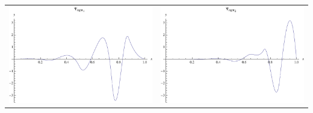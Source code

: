 \documentclass{article}
\begin{document}
\begin{landscape}
\begin{tabular}{cc}
\includegraphics[width=10.cm]{cubic_wavelet_dright_1.pdf}& \includegraphics[width=10.cm]{cubic_wavelet_dright_2.pdf} \\
\end{tabular} 
 \end{landscape}
\end{document}
